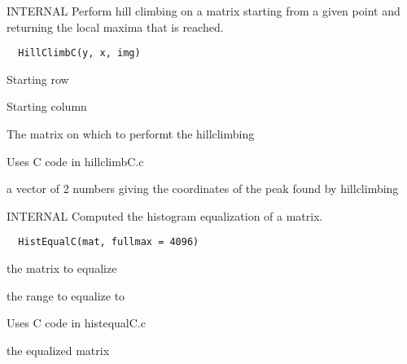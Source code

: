 \documentclass[a4paper]{book}
\begin{document}
%
\begin{Description}\relax
INTERNAL Perform hill climbing on a matrix starting from
a given point and returning the local maxima that is
reached.
\end{Description}
%
\begin{Usage}
\begin{verbatim}
  HillClimbC(y, x, img)
\end{verbatim}
\end{Usage}
%
\begin{Arguments}
\begin{ldescription}
\item[\code{y}] Starting row

\item[\code{x}] Starting column

\item[\code{img}] The matrix on which to performt the
hillclimbing
\end{ldescription}
\end{Arguments}
%
\begin{Details}\relax
Uses C code in hillclimbC.c
\end{Details}
%
\begin{Value}
a vector of 2 numbers giving the coordinates of the peak
found by hillclimbing
\end{Value}
%
\begin{Description}\relax
INTERNAL Computed the histogram equalization of a matrix.
\end{Description}
%
\begin{Usage}
\begin{verbatim}
  HistEqualC(mat, fullmax = 4096)
\end{verbatim}
\end{Usage}
%
\begin{Arguments}
\begin{ldescription}
\item[\code{mat}] the matrix to equalize

\item[\code{fullmax}] the range to equalize to
\end{ldescription}
\end{Arguments}
%
\begin{Details}\relax
Uses C code in histequalC.c
\end{Details}
%
\begin{Value}
the equalized matrix
\end{Value}
\end{document}
